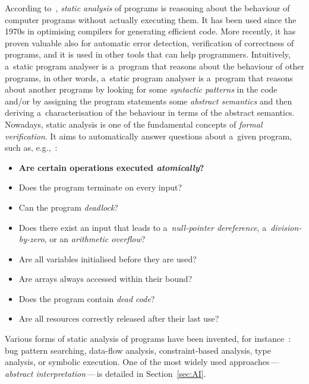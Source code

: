 According to~\cite{staticAnalysisMoller}, \emph{static analysis} of
programs is reasoning about the behaviour of computer programs without
actually executing them. It has been used since the 1970s in optimising
compilers for generating efficient code. More recently, it has proven
valuable also for automatic error detection, verification of correctness
of programs, and it is used in other tools that can help programmers.
Intuitively, a~static program analyser is a~program that reasons about the
behaviour of other programs, in other words, a~static program analyser is
a~program that reasons about another programs by looking for some
\emph{syntactic patterns} in the code and/or by assigning the program
statements some \emph{abstract semantics} and then deriving
a~characterisation of the behaviour in terms of the abstract semantics.
Nowadays, static analysis is one of the fundamental concepts of
\emph{formal verification}. It aims to automatically answer questions
about a~given program, such as, e.g.,~\cite{staticAnalysisMoller}:
\begin{itemize}
    \item
        \textbf{Are certain operations executed \emph{atomically}?}

    \item
        Does the program terminate on every input?

    \item
        Can the program \emph{deadlock}?

    \item
        Does there exist an input that leads to a~\emph{null-pointer
        dereference}, a~\emph{division-by-zero}, or an \emph{arithmetic
        overflow}?

    \item
        Are all variables initialised before they are used?

    \item
        Are arrays always accessed within their bound?

    \item
        Does the program contain \emph{dead code}?

    \item
        Are all resources correctly released after their last
        use?
\end{itemize}

Various forms of static analysis of programs have been invented, for
instance~\cite{harmimBP}: bug pattern searching, data-flow
analysis, constraint-based analysis, type analysis, or symbolic execution.
One of the most widely used approaches\,---\,\emph{abstract
interpretation}\,---\,is detailed in Section~\ref{sec:AI}.

